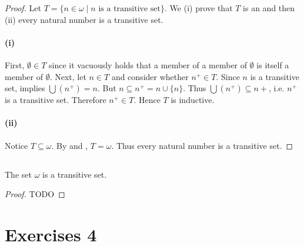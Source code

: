 \documentclass{report}
\begin{document}
\begin{proof}

  Let $T = \{n \in \omega \mid n \text{ is a transitive set}\}$.
  We (i) prove that $T$ is an  and then (ii) every
    natural number is a transitive set.

  \paragraph{(i)}%
  \label{par:theorem-4f-i}

    First, $\emptyset \in T$ since it vacuously holds that a member of a
      member of $\emptyset$ is itself a member of $\emptyset$.
    Next, let $n \in T$ and consider whether $n^+ \in T$.
    Since $n$ is a transitive set,  implies
      $\bigcup \left(n^+\right) = n$.
    But $n \subseteq n^+ = n \cup \{n\}$.
    Thus $\bigcup \left(n^+\right) \subseteq n+$, i.e. $n^+$ is a transitive
      set.
    Therefore $n^+ \in T$.
    Hence $T$ is inductive.

  \paragraph{(ii)}%

    Notice $T \subseteq \omega$.
    By  and , $T = \omega$.
    Thus every natural number is a transitive set.

\end{proof}

\subsection{}%
\label{sub:theorem-4g}

\begin{theorem}[4G]

  The set $\omega$ is a transitive set.

\end{theorem}

\begin{proof}

  TODO

\end{proof}

\section{Exercises 4}%
\end{document}
